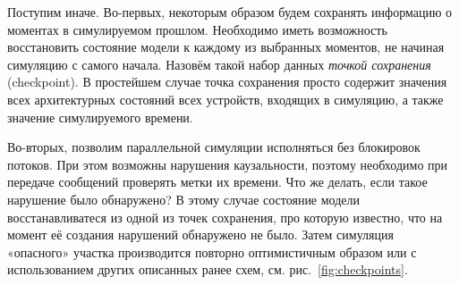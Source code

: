 Поступим иначе. Во-первых, некоторым образом будем сохранять информацию о моментах в симулируемом прошлом. Необходимо иметь возможность восстановить состояние модели к каждому из выбранных моментов, не начиная симуляцию с самого начала. Назовём такой набор данных \textit{точкой сохранения} (\abbr checkpoint). В простейшем случае точка сохранения просто содержит значения всех архитектурных состояний всех устройств, входящих в симуляцию, а также значение симулируемого времени.

Во-вторых, позволим параллельной симуляции исполняться без блокировок потоков. При этом возможны нарушения каузальности, поэтому необходимо при передаче сообщений проверять метки их времени. Что же делать, если такое нарушение было обнаружено? В этому случае состояние модели восстанавливатеся из одной из точек сохранения, про которую известно, что на момент её создания нарушений обнаружено не было. Затем симуляция «опасного» участка производится повторно оптимистичным образом или с использованием других описанных ранее схем, см. рис.~\ref{fig:checkpoints}.

